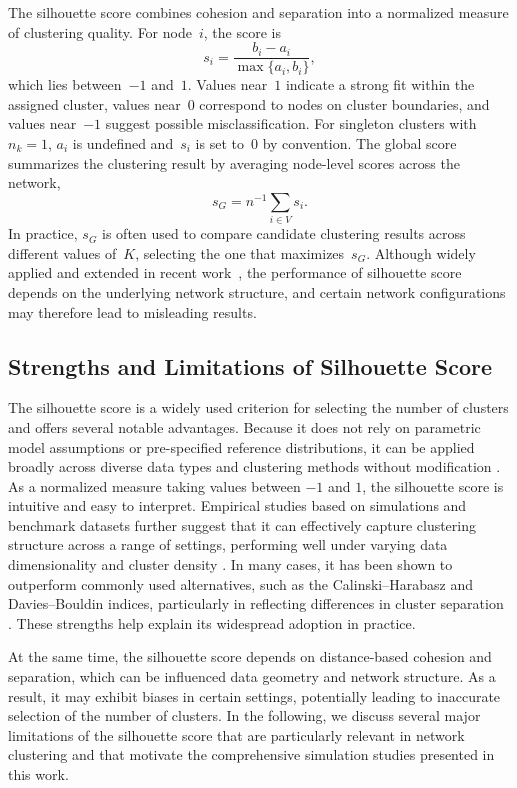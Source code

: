 \documentclass[12pt, titlepage, reqno]{article}
\begin{document}
The silhouette score combines cohesion and separation into a
normalized measure of clustering quality. For node~$i$, the score is
\[
  s_i = \frac{b_i - a_i}{\max\{a_i, b_i\}},
\]
which lies between~$-1$ and~$1$. Values near~$1$ indicate a strong
fit within the assigned cluster, values near~$0$ correspond to nodes
on cluster boundaries, and values near~$-1$ suggest possible
misclassification. For singleton clusters with $n_k=1$, $a_i$ is
undefined and~$s_i$ is set to~$0$ by convention. The global score
summarizes the clustering result by averaging node-level scores
across the network,
\[
  s_G = n^{-1} \sum_{i \in V} s_i.
\]
In practice, $s_G$ is often used to compare candidate
clustering results across different values of~$K$, selecting the one 
that maximizes~$s_G$. Although widely applied and extended in recent
work~\citep{lenssen2024medoid, vardakas2024deep}, the performance of 
silhouette score depends on the underlying network structure, and 
certain network configurations may therefore lead to misleading 
results.


\subsection{Strengths and Limitations of Silhouette Score}
\label{sec:limit} 

The silhouette score is a widely used criterion for selecting the 
number of clusters and offers several notable advantages. Because it 
does not rely on parametric model assumptions or pre-specified 
reference distributions, it can be applied broadly across diverse 
data types and clustering methods without modification 
\citep{shahapure2020cluster}. As a normalized measure taking values 
between $-1$ and $1$, the silhouette score is intuitive and easy to 
interpret. Empirical studies based on simulations and benchmark 
datasets further suggest that it can effectively capture clustering 
structure across a range of settings, performing well under varying 
data dimensionality and cluster density 
\citep{arbelaitz2013extensive, liu2010understanding}. In many cases, 
it has been shown to outperform commonly used alternatives, such as 
the Calinski--Harabasz and Davies--Bouldin indices, particularly in 
reflecting differences in cluster separation 
\citep{arbelaitz2013extensive, chicco2025silhouette}. These strengths 
help explain its widespread adoption in practice.

At the same time, the silhouette score depends on distance-based 
cohesion and separation, which can be influenced data 
geometry and network structure. As a result, it may exhibit biases in 
certain settings, potentially leading to inaccurate selection of the 
number of clusters. In the following, we discuss several major 
limitations of the silhouette score that are particularly relevant in 
network clustering and that 
motivate the comprehensive simulation studies presented in this work.
\end{document}
